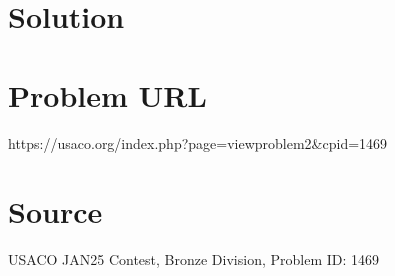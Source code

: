 \documentclass[12pt]{article}
\begin{document}
\section*{Solution}


\section*{Problem URL}
https://usaco.org/index.php?page=viewproblem2&cpid=1469

\section*{Source}
USACO JAN25 Contest, Bronze Division, Problem ID: 1469
\end{document}
